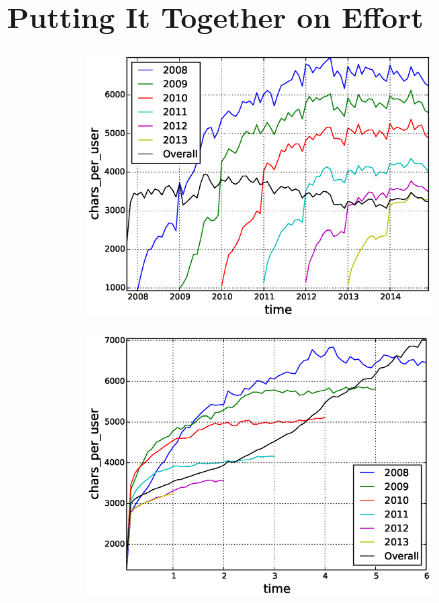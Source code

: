 %
\section{Putting It Together on Effort}  %

\begin{figure}[!tb]
\centering
\begin{subfigure}{.49\textwidth}\includegraphics[scale=0.4]{./images/avr_comment_size_user_over_time_cohorts.eps}\caption{}\end{subfigure}
\begin{subfigure}{.49\textwidth}\includegraphics[scale=0.4]{./images/avr_comment_size_user_cohorts.eps}\caption{}\end{subfigure}

\end{figure}
